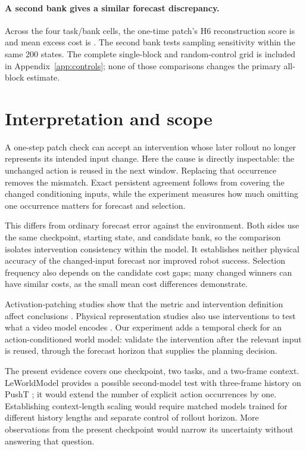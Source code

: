 \documentclass{article}
\begin{document}
\paragraph{A second bank gives a similar forecast discrepancy.}
Across the four task/bank cells, the one-time patch's H6 reconstruction score is \LCFMReconRange{} and mean excess cost is \LCFMCostRange{}. The second bank tests sampling sensitivity within the same 200 states. The complete single-block and random-control grid is included in Appendix~\ref{app:controls}; none of those comparisons changes the primary all-block estimate.

\newpage
\section{Interpretation and scope}
\label{sec:scope}
A one-step patch check can accept an intervention whose later rollout no longer represents its intended input change. Here the cause is directly inspectable: the unchanged action is reused in the next window. Replacing that occurrence removes the mismatch. Exact persistent agreement follows from covering the changed conditioning inputs, while the experiment measures how much omitting one occurrence matters for forecast and selection.

This differs from ordinary forecast error against the environment. Both sides use the same checkpoint, starting state, and candidate bank, so the comparison isolates intervention consistency within the model. It establishes neither physical accuracy of the changed-input forecast nor improved robot success. Selection frequency also depends on the candidate cost gaps; many changed winners can have similar costs, as the small mean cost differences demonstrate.

Activation-patching studies show that the metric and intervention definition affect conclusions \citep{zhang2023patching}. Physical representation studies also use interventions to test what a video model encodes \citep{joseph2026interpretingphysics}. Our experiment adds a temporal check for an action-conditioned world model: validate the intervention after the relevant input is reused, through the forecast horizon that supplies the planning decision.

The present evidence covers one checkpoint, two tasks, and a two-frame context. LeWorldModel provides a possible second-model test with three-frame history on PushT \citep{maes2026lewm}; it would extend the number of explicit action occurrences by one. Establishing context-length scaling would require matched models trained for different history lengths and separate control of rollout horizon. More observations from the present checkpoint would narrow its uncertainty without answering that question.
\end{document}
